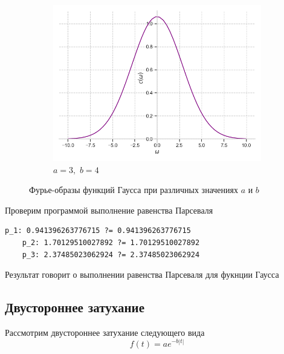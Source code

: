 \documentclass[a4paper, 16pt]{article}
\begin{document}
\begin{figure}[htbp]
\begin{subfigure}{0.3\textwidth}
            \centering
            \includegraphics[width=\linewidth]{gausfimg_a=3_b=4.png}
            \caption{$a=3,\,\,b=4$}
            \label{fig:gausfimg_3}
        \end{subfigure}
        \caption{Фурье-образы функций Гаусса при различных значениях $a$ и $b$}
        \label{fig:gausfimgs}
    \end{figure}


    \noindent Проверим программой выполнение равенства Парсеваля
    \begin{lstlisting}[label=pars_gaus, caption=Равенство Парсеваля для функции Гаусса]
    p_1: 0.941396263776715 ?= 0.941396263776715
    p_2: 1.70129510027892 ?= 1.70129510027892
    p_3: 2.37485023062924 ?= 2.37485023062924
    \end{lstlisting}


    \noindent Результат говорит о выполнении равенства Парсеваля для фукнции Гаусса


    \subsection{Двустороннее затухание}
    \noindent Рассмотрим двустороннее затухание следующего вида
    $$
    f(t)=ae^{-b|t|}
    $$
\end{document}
